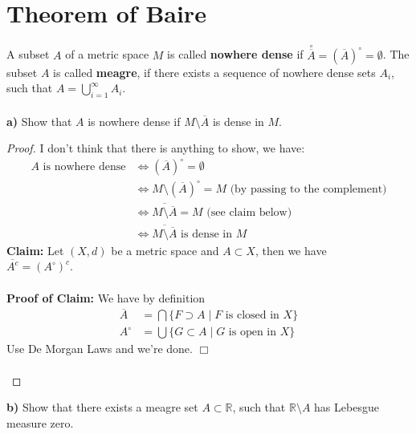 \documentclass[12pt,a4paper]{article}
\begin{document}
\section{Theorem of Baire}
A subset $A$ of a metric space $M$ is called \textbf{nowhere dense} if $\overset{\circ}{\overline{A}}=(\overline{A})^\circ = \emptyset$. The subset $A$ is called \textbf{meagre}, if there exists a sequence of nowhere dense sets $A_i$, such that $A= \bigcup_{i=1}^\infty A_i$. 
\\\\
\textbf{a)} Show that $A$ is nowhere dense if $M \setminus \overline{A}$ is dense in $M$. 
\begin{proof}
I don't think that there is anything to show, we have:
\begin{align*}
A \text{ is nowhere dense} &\iff \left( \overline{A}\right)^\circ = \emptyset \\
& \iff M \setminus \left( \overline{A}\right)^\circ = M \text{ (by passing to the complement)} \\
& \iff \overline{M \setminus \overline{A}} = M  \text{ (see claim below)}\\
& \iff \overline{M \setminus \overline{A}} \text{ is dense in } M 
\end{align*}
\textbf{Claim:} Let $(X,d)$ be a metric space and $A \subset X$, then we have \\ $\overline{A^c}= \left(A^\circ \right)^c$. \\
\\
\textbf{Proof of Claim:} We have by definition
\begin{align*}
\overline{A}&= \bigcap \lbrace F \supset A \mid F \text{ is closed in } X \rbrace \\
A^\circ &= \bigcup \lbrace G \subset A \mid G \text{ is open in } X \rbrace 
\end{align*}
Use De Morgan Laws and we're done. \hfill $\Box$
\\\\
\end{proof}
\newpage
\noindent \textbf{b)} Show that there exists a meagre set $A \subset \mathbb{R}$, such that $\mathbb{R} \setminus A$ has Lebesgue measure zero. 
\end{document}
